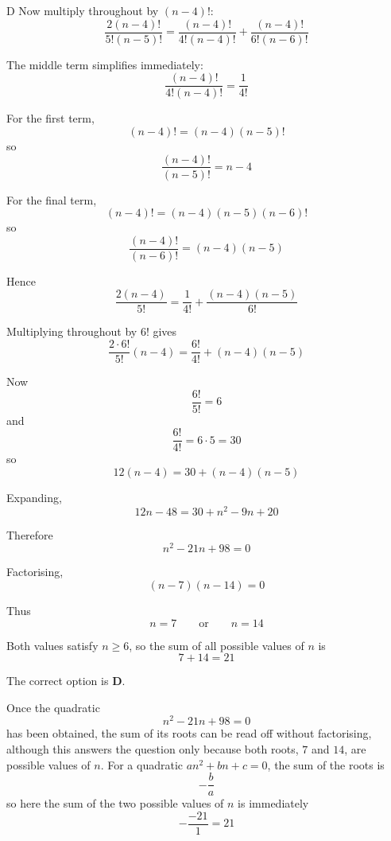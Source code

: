 \documentclass[11pt,a4paper]{article}
\begin{document}
\begin{enumerate}[label=\textbf{\arabic*.},leftmargin=*,itemsep=0pt,start=16]
\begin{djsSolution}{D}
Now multiply throughout by \((n-4)!\):
\[
\frac{2(n-4)!}{5!(n-5)!}
=
\frac{(n-4)!}{4!(n-4)!}
+
\frac{(n-4)!}{6!(n-6)!}
\]

The middle term simplifies immediately:
\[
\frac{(n-4)!}{4!(n-4)!}
=
\frac{1}{4!}
\]

For the first term,
\[
(n-4)!=(n-4)(n-5)!
\]
so
\[
\frac{(n-4)!}{(n-5)!}
=
n-4
\]

For the final term,
\[
(n-4)!=(n-4)(n-5)(n-6)!
\]
so
\[
\frac{(n-4)!}{(n-6)!}
=
(n-4)(n-5)
\]

Hence
\[
\frac{2(n-4)}{5!}
=
\frac{1}{4!}
+
\frac{(n-4)(n-5)}{6!}
\]

Multiplying throughout by \(6!\) gives
\[
\frac{2\cdot6!}{5!}(n-4)
=
\frac{6!}{4!}
+
(n-4)(n-5)
\]

Now
\[
\frac{6!}{5!}=6
\]
and
\[
\frac{6!}{4!}=6\cdot5=30
\]
so
\[
12(n-4)
=
30+(n-4)(n-5)
\]

Expanding,
\[
12n-48
=
30+n^2-9n+20
\]

Therefore
\[
n^2-21n+98=0
\]

Factorising,
\[
(n-7)(n-14)=0
\]

Thus
\[
n=7
\qquad\text{or}\qquad
n=14
\]

Both values satisfy \(n\geq6\), so the sum of all possible values of \(n\) is
\[
7+14=21
\]

The correct option is \textbf{D}.

\medskip

Once the quadratic
\[
n^2-21n+98=0
\]
has been obtained, the sum of its roots can be read off without factorising, although this answers the question only because both roots, \(7\) and \(14\), are possible values of \(n\). For a quadratic \(an^2+bn+c=0\), the sum of the roots is
\[
-\frac{b}{a}
\]
so here the sum of the two possible values of \(n\) is immediately
\[
-\frac{-21}{1}=21
\]
\end{djsSolution}
\end{enumerate}
\clearpage
\thispagestyle{djssolutions}
\vspace*{8pt}
\end{document}
